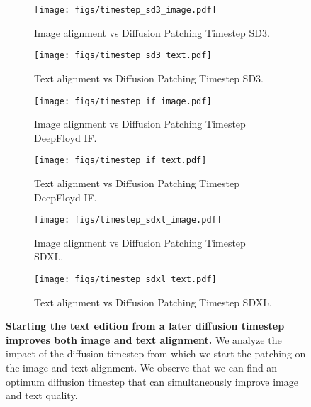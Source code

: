 \begin{figure}[h]
    \centering
    \begin{subfigure}{0.4\textwidth}
        \centering
        \texttt{[image: figs/timestep\_sd3\_image.pdf]}
        \caption{Image alignment vs Diffusion Patching Timestep SD3.
        }
        \label{fig:sd3_timestep_image}
    \end{subfigure}
    \hspace{0.05\textwidth} %
    \begin{subfigure}{0.4\textwidth}
        \centering
        \texttt{[image: figs/timestep\_sd3\_text.pdf]}
        \caption{Text alignment vs Diffusion Patching Timestep SD3.
        }
        \label{fig:sd3_timestep_text}
    \end{subfigure}

    \begin{subfigure}{0.4\textwidth}
        \centering
        \texttt{[image: figs/timestep\_if\_image.pdf]}
        \caption{Image alignment vs Diffusion Patching Timestep DeepFloyd IF.
        }
        \label{fig:if_timestep_image}
    \end{subfigure}
    \hspace{0.05\textwidth} %
    \begin{subfigure}{0.4\textwidth}
        \centering
        \texttt{[image: figs/timestep\_if\_text.pdf]}
        \caption{Text alignment vs Diffusion Patching Timestep DeepFloyd IF.
        }
        \label{fig:if_timestep_text}
    \end{subfigure}

    \begin{subfigure}{0.4\textwidth}
        \centering
        \texttt{[image: figs/timestep\_sdxl\_image.pdf]}
        \caption{Image alignment vs Diffusion Patching Timestep SDXL.
        }
        \label{fig:sdxl_timestep_image}
    \end{subfigure}
    \hspace{0.05\textwidth} %
    \begin{subfigure}{0.4\textwidth}
        \centering
        \texttt{[image: figs/timestep\_sdxl\_text.pdf]}
        \caption{Text alignment vs Diffusion Patching Timestep SDXL.
        }
        \label{fig:sdxl_timestep_text}
    \end{subfigure}

    \caption{\textbf{Starting the text edition from a later diffusion timestep improves both image and text alignment.}
        We analyze the impact of the diffusion timestep from which we start the patching on the image and text alignment. We observe that we can find an optimum diffusion timestep that can simultaneously improve image and text quality.
    }
    \label{fig:models_timestep}
\end{figure}







